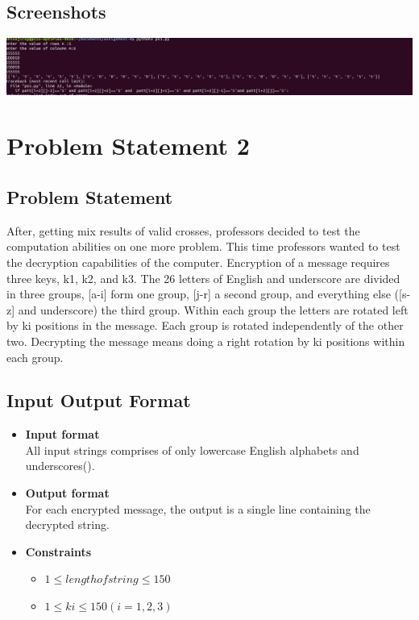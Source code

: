 \documentclass[a4paper,12pt]{article}
\begin{document}
\subsection{Screenshots}

\includegraphics[scale=0.35]{Screenshot1.png}

\section{Problem Statement 2}
\subsection{Problem Statement}
After, getting mix results of valid crosses, professors decided to test the computation abilities on one more problem. This time professors wanted to test the decryption capabilities of the computer.
Encryption of  a message requires three keys, k1, k2, and k3. The 26 letters of English and underscore are divided in three groups,  [a-i] form one group, [j-r] a second group, and everything else ([s-z] and underscore) the third group. Within each group the letters are rotated left by ki positions in the message. Each group is rotated independently of the other two. Decrypting the message means doing a right rotation by ki positions within each group.



\subsection{Input Output Format}
\begin{itemize}
\item \textbf{Input format} \\
All input strings comprises of only lowercase English alphabets and underscores(\textunderscore).\\
\item \textbf{Output format}\\
For each encrypted message, the output is a single line containing the decrypted string. \\
\item \textbf{Constraints} \\
\begin{itemize}
\item $1 \leqslant length of string \leqslant 150$
\item $1 \leqslant ki \leqslant 150(i=1,2,3)$
\end{itemize}
\end{itemize}
\end{document}
